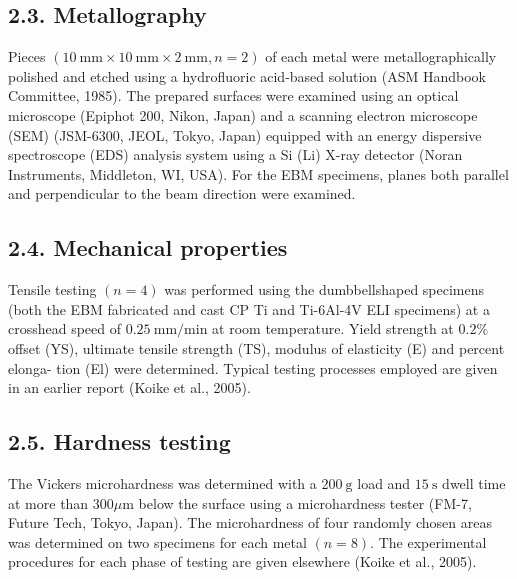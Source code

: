 \documentclass[10pt]{article}
\begin{document}
\subsection*{2.3. Metallography}
Pieces $(10 \mathrm{~mm} \times 10 \mathrm{~mm} \times 2 \mathrm{~mm}, n=2)$ of each metal were metallographically polished and etched using a hydrofluoric acid-based solution (ASM Handbook Committee, 1985). The prepared surfaces were examined using an optical microscope (Epiphot 200, Nikon, Japan) and a scanning electron microscope (SEM) (JSM-6300, JEOL, Tokyo, Japan) equipped with an energy dispersive spectroscope (EDS) analysis system using a Si (Li) X-ray detector (Noran Instruments, Middleton, WI, USA). For the EBM specimens, planes both parallel and perpendicular to the beam direction were examined.

\subsection*{2.4. Mechanical properties}
Tensile testing $(n=4)$ was performed using the dumbbellshaped specimens (both the EBM fabricated and cast CP Ti and Ti-6Al-4V ELI specimens) at a crosshead speed of $0.25 \mathrm{~mm} / \mathrm{min}$ at room temperature. Yield strength at $0.2 \%$ offset (YS), ultimate tensile strength (TS), modulus of elasticity (E) and percent elonga- tion (El) were determined. Typical testing processes employed are given in an earlier report (Koike et al., 2005).

\subsection*{2.5. Hardness testing}
The Vickers microhardness was determined with a $200 \mathrm{~g}$ load and $15 \mathrm{~s}$ dwell time at more than $300 \mu \mathrm{m}$ below the surface using a microhardness tester (FM-7, Future Tech, Tokyo, Japan). The microhardness of four randomly chosen areas was determined on two specimens for each metal $(n=8)$. The experimental procedures for each phase of testing are given elsewhere (Koike et al., 2005).
\end{document}

